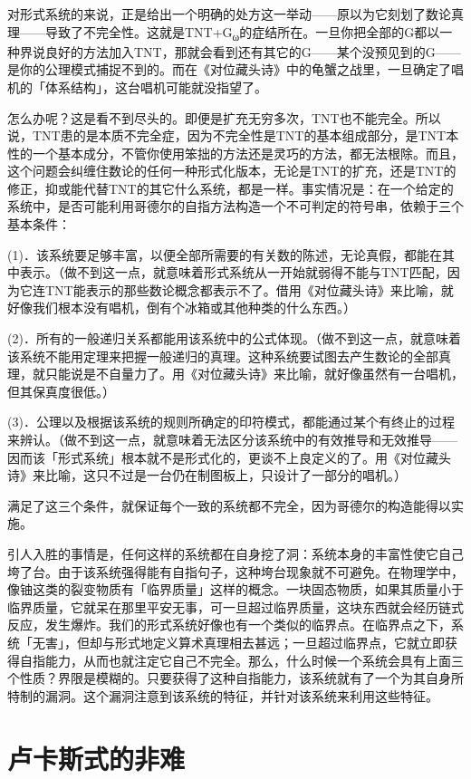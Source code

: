 \documentclass[
  12pt,
  twoside,
  openright,
  oldfontcommands,
]{memoir}
\begin{document}
对形式系统的来说，正是给出一个明确的处方这一举动------原以为它刻划了数论真理------导致了不完全性。这就是TNT+G\textsubscript{ω}的症结所在。一旦你把全部的G都以一种界说良好的方法加入TNT，那就会看到还有其它的G------某个没预见到的G------是你的公理模式捕捉不到的。而在《对位藏头诗》中的龟蟹之战里，一旦确定了唱机的「体系结构」，这台唱机可能就没指望了。

怎么办呢？这是看不到尽头的。即便是扩充无穷多次，TNT也不能完全。所以说，TNT患的是本质不完全症，因为不完全性是TNT的基本组成部分，是TNT本性的一个基本成分，不管你使用笨拙的方法还是灵巧的方法，都无法根除。而且，这个问题会纠缠住数论的任何一种形式化版本，无论是TNT的扩充，还是TNT的修正，抑或能代替TNT的其它什么系统，都是一样。事实情况是：在一个给定的系统中，是否可能利用哥德尔的自指方法构造一个不可判定的符号串，依赖于三个基本条件：

(1)．该系统要足够丰富，以便全部所需要的有关数的陈述，无论真假，都能在其中表示。（做不到这一点，就意味着形式系统从一开始就弱得不能与TNT匹配，因为它连TNT能表示的那些数论概念都表示不了。借用《对位藏头诗》来比喻，就好像我们根本没有唱机，倒有个冰箱或其他种类的什么东西。）

(2)．所有的一般递归关系都能用该系统中的公式体现。（做不到这一点，就意味着该系统不能用定理来把握一般递归的真理。这种系统要试图去产生数论的全部真理，就只能说是不自量力了。用《对位藏头诗》来比喻，就好像虽然有一台唱机，但其保真度很低。）

(3)．公理以及根据该系统的规则所确定的印符模式，都能通过某个有终止的过程来辨认。（做不到这一点，就意味着无法区分该系统中的有效推导和无效推导------因而该「形式系统」根本就不是形式化的，更谈不上良定义的了。用《对位藏头诗》来比喻，这只不过是一台仍在制图板上，只设计了一部分的唱机。）

满足了这三个条件，就保证每个一致的系统都不完全，因为哥德尔的构造能得以实施。

引人入胜的事情是，任何这样的系统都在自身挖了洞：系统本身的丰富性使它自己垮了台。由于该系统强得能有自指句子，这种垮台现象就不可避免。在物理学中，像铀这类的裂变物质有「临界质量」这样的概念。一块固态物质，如果其质量小于临界质量，它就呆在那里平安无事，可一旦超过临界质量，这块东西就会经历链式反应，发生爆炸。我们的形式系统好像也有一个类似的临界点。在临界点之下，系统「无害」，但却与形式地定义算术真理相去甚远；一旦超过临界点，它就立即获得自指能力，从而也就注定它自己不完全。那么，什么时候一个系统会具有上面三个性质？界限是模糊的。只要获得了这种自指能力，该系统就有了一个为其自身所特制的漏洞。这个漏洞注意到该系统的特征，并针对该系统来利用这些特征。

\section{卢卡斯式的非难}
\end{document}

